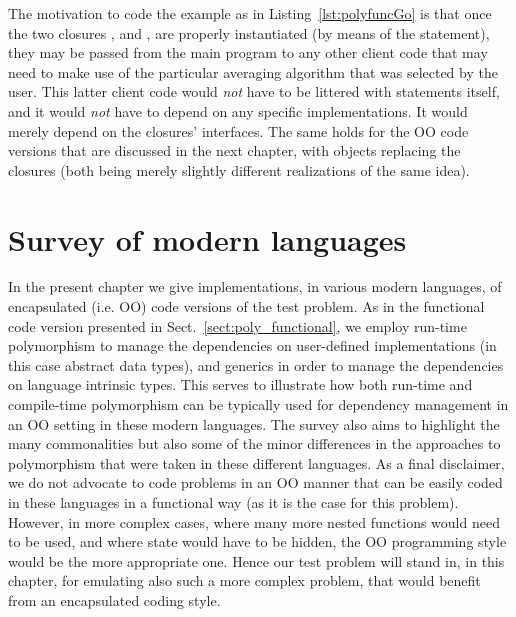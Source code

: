 \documentclass[11pt,oneside]{report}
\newcommand{\code}[1]{{\selectfont\ttfamily{#1}}}
\begin{document}


The motivation to code the example as in Listing~\ref{lst:polyfuncGo}
is that once the two closures \code{avi}, and \code{avf}, are properly
instantiated (by means of the \code{switch} statement), they may be
passed from the main program to any other client code that may need to
make use of the particular averaging algorithm that was selected by
the user. This latter client code would \emph{not} have to be littered
with \code{switch} statements itself, and it would \emph{not} have to
depend on any specific implementations. It would merely depend on the
closures' interfaces. The same holds for the OO code versions that are
discussed in the next chapter, with objects replacing the closures
(both being merely slightly different realizations of the same idea).

\chapter{Survey of modern languages}
\label{sect:survey}

In the present chapter we give implementations, in various modern
languages, of encapsulated (i.e. OO) code versions of the test
problem. As in the functional code version presented in
Sect.~\ref{sect:poly_functional}, we employ run-time polymorphism to
manage the dependencies on user-defined implementations (in this case
abstract data types), and generics in order to manage the dependencies
on language intrinsic types. This serves to illustrate how both
run-time and compile-time polymorphism can be typically used for
dependency management in an OO setting in these modern languages. The
survey also aims to highlight the many commonalities but also some
of the minor differences in the approaches to polymorphism that were
taken in these different languages. As a final disclaimer, we do not
advocate to code problems in an OO manner that can be easily coded in
these languages in a functional way (as it is the case for this
problem). However, in more complex cases, where many more nested
functions would need to be used, and where state would have to be
hidden, the OO programming style would be the more appropriate
one. Hence our test problem will stand in, in this chapter, for
emulating also such a more complex problem, that would benefit from an
encapsulated coding style.
\end{document}
